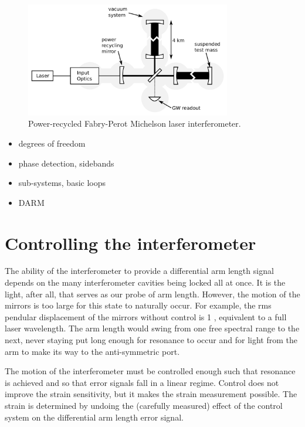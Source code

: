 \begin{figure}
\begin{centering}
\includegraphics[width=0.8\textwidth]{figures/IFOschematic.pdf}
\caption{Power-recycled Fabry-Perot Michelson laser interferometer.}
\label{fig:IFOschematic}
\end{centering}
\end{figure}


\begin{itemize}
\item degrees of freedom
\item phase detection, sidebands
\item sub-systems, basic loops
\item DARM
\end{itemize}




\section{Controlling the interferometer}
The ability of the interferometer to provide a differential arm length
signal depends on the many interferometer cavities being locked all at
once. It is the light, after all, that serves as our probe of arm
length. However, the motion of the mirrors is too large for this state
to naturally occur. For example, the rms pendular displacement of the
mirrors without control is 1 \micron, equivalent to a full laser
wavelength. The arm length would swing from one free spectral range to
the next, never staying put long enough for resonance to occur and for
light from the arm to make its way to the anti-symmetric port.

The motion of the interferometer must be controlled enough such that
resonance is achieved and so that error signals fall in a linear
regime. Control does not improve the strain sensitivity, but it makes
the strain measurement possible. The strain is determined by undoing
the (carefully measured) effect of the control system on the
differential arm length error signal.

